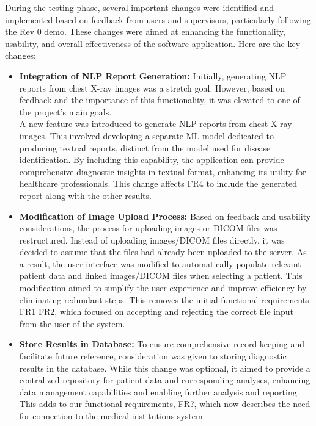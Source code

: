 \documentclass[12pt, titlepage]{article}
\begin{document}
During the testing phase, several important changes were identified and implemented based on feedback from users and supervisors, particularly following the Rev 0 demo. These changes were aimed at enhancing the functionality, usability, and overall effectiveness of the software application. Here are the key changes:
\begin{itemize}
    \item \textbf{Integration of NLP Report Generation:}  Initially, generating NLP reports from chest X-ray images was a stretch goal. However, based on feedback and the importance of this functionality, it was elevated to one of the project's main goals. \\
    A new feature was introduced to generate NLP reports from chest X-ray images. This involved developing a separate ML model dedicated to producing textual reports, distinct from the model used for disease identification. By including this capability, the application can provide comprehensive diagnostic insights in textual format, enhancing its utility for healthcare professionals. This change affects FR4 to include the generated report along with the other results. 
    \item \textbf{Modification of Image Upload Process:} Based on feedback and usability considerations, the process for uploading images or DICOM files was restructured. Instead of uploading images/DICOM files directly, it was decided to assume that the files had already been uploaded to the server. As a result, the user interface was modified to automatically populate relevant patient data and linked images/DICOM files when selecting a patient. This modification aimed to simplify the user experience and improve efficiency by eliminating redundant steps. This removes the initial functional requirements FR1 FR2, which focused on accepting and rejecting the correct file input from the user of the system. 
    \item \textbf{Store Results in Database:} To ensure comprehensive record-keeping and facilitate future reference, consideration was given to storing diagnostic results in the database. While this change was optional, it aimed to provide a centralized repository for patient data and corresponding analyses, enhancing data management capabilities and enabling further analysis and reporting. This adds to our functional requirements, FR?, which now describes the need for connection to the medical institutions system. 

\end{itemize}
\end{document}
